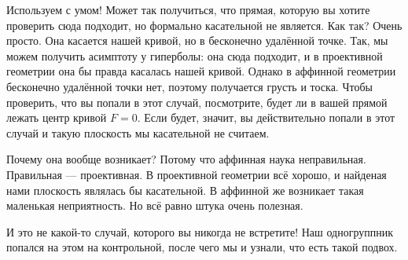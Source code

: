 \begin{orangebox}
    Используем с умом! Может так получиться, что прямая, которую вы хотите проверить сюда подходит, но формально касательной не является. Как так? Очень просто. Она касается нашей кривой, но в бесконечно удалённой точке. Так, мы можем получить асимптоту у гиперболы: она сюда подходит, и в проективной геометрии она бы правда касалась нашей кривой. Однако в аффинной геометрии бесконечно удалённой точки нет, поэтому получается грусть и тоска. Чтобы проверить, что вы попали в этот случай, посмотрите, будет ли в вашей прямой лежать центр кривой $F = 0$. Если будет, значит, вы действительно попали в этот случай и такую плоскость мы касательной не считаем.

    Почему она вообще возникает? Потому что аффинная наука неправильная. Правильная --- проективная. В проективной геометрии всё хорошо, и найденая нами плоскость являлась бы касательной. В аффинной же возникает такая маленькая неприятность. Но всё равно штука очень полезная.

    И это не какой-то случай, которого вы никогда не встретите! Наш одногруппник попался на этом на контрольной, после чего мы и узнали, что есть такой подвох.
\end{orangebox}


